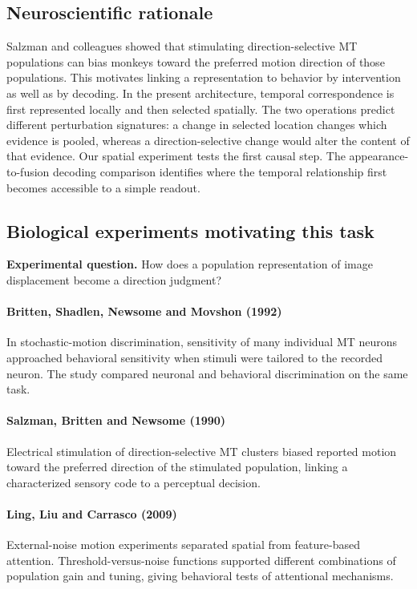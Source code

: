 \documentclass[11pt]{article}
\begin{document}
\subsection{Neuroscientific rationale}
Salzman and colleagues showed that stimulating direction-selective MT populations can bias monkeys toward the preferred motion direction of those populations. This motivates linking a representation to behavior by intervention as well as by decoding. In the present architecture, temporal correspondence is first represented locally and then selected spatially. The two operations predict different perturbation signatures: a change in selected location changes which evidence is pooled, whereas a direction-selective change would alter the content of that evidence. Our spatial experiment tests the first causal step. The appearance-to-fusion decoding comparison identifies where the temporal relationship first becomes accessible to a simple readout.

\subsection{Biological experiments motivating this task}
\textbf{Experimental question.} How does a population representation of image displacement become a direction judgment?

\paragraph{Britten, Shadlen, Newsome and Movshon (1992)} In stochastic-motion discrimination, sensitivity of many individual MT neurons approached behavioral sensitivity when stimuli were tailored to the recorded neuron. The study compared neuronal and behavioral discrimination on the same task. \cite{bio_britten}

\paragraph{Salzman, Britten and Newsome (1990)} Electrical stimulation of direction-selective MT clusters biased reported motion toward the preferred direction of the stimulated population, linking a characterized sensory code to a perceptual decision. \cite{bio_salzman}

\paragraph{Ling, Liu and Carrasco (2009)} External-noise motion experiments separated spatial from feature-based attention. Threshold-versus-noise functions supported different combinations of population gain and tuning, giving behavioral tests of attentional mechanisms. \cite{bio_ling}
\end{document}
